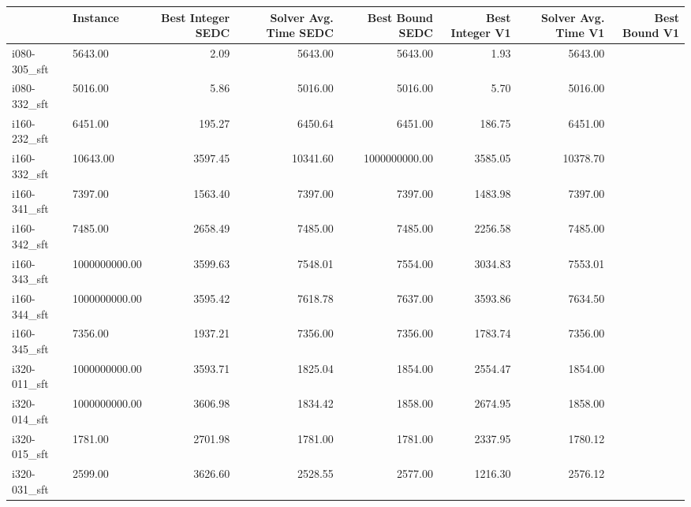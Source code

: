 \begin{tabular}{llrrrrrr}
\toprule
{} &      Instance &  Best Integer SEDC &  Solver Avg. Time SEDC &  Best Bound SEDC &  Best Integer V1 &  Solver Avg. Time V1 &  Best Bound V1 \\
\midrule
i080-305\_sft &            5643.00 &                   2.09 &          5643.00 &          5643.00 &                 1.93 &        5643.00 \\
i080-332\_sft &            5016.00 &                   5.86 &          5016.00 &          5016.00 &                 5.70 &        5016.00 \\
i160-232\_sft &            6451.00 &                 195.27 &          6450.64 &          6451.00 &               186.75 &        6451.00 \\
i160-332\_sft &           10643.00 &                3597.45 &         10341.60 &    1000000000.00 &              3585.05 &       10378.70 \\
i160-341\_sft &            7397.00 &                1563.40 &          7397.00 &          7397.00 &              1483.98 &        7397.00 \\
i160-342\_sft &            7485.00 &                2658.49 &          7485.00 &          7485.00 &              2256.58 &        7485.00 \\
i160-343\_sft &      1000000000.00 &                3599.63 &          7548.01 &          7554.00 &              3034.83 &        7553.01 \\
i160-344\_sft &      1000000000.00 &                3595.42 &          7618.78 &          7637.00 &              3593.86 &        7634.50 \\
i160-345\_sft &            7356.00 &                1937.21 &          7356.00 &          7356.00 &              1783.74 &        7356.00 \\
i320-011\_sft &      1000000000.00 &                3593.71 &          1825.04 &          1854.00 &              2554.47 &        1854.00 \\
i320-014\_sft &      1000000000.00 &                3606.98 &          1834.42 &          1858.00 &              2674.95 &        1858.00 \\
i320-015\_sft &            1781.00 &                2701.98 &          1781.00 &          1781.00 &              2337.95 &        1780.12 \\
i320-031\_sft &            2599.00 &                3626.60 &          2528.55 &          2577.00 &              1216.30 &        2576.12 \\

\end{tabular}
